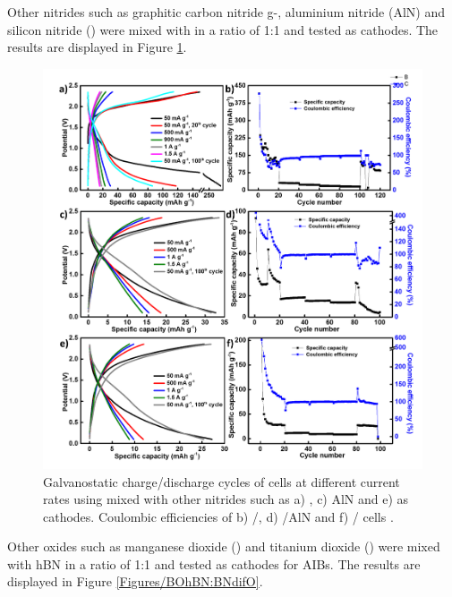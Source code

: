 Other nitrides such as graphitic carbon nitride g-, aluminium nitride (AlN) and silicon nitride () were mixed with  in a ratio of 1:1 and tested as cathodes. The results are displayed in Figure \ref{Figures/BOhBN:Bonit}. 
\begin{figure}[tbh!]
\centering
\includegraphics[width=\textwidth]{Figures/BOhBN/Bonit}
\caption{Galvanostatic charge/discharge cycles of cells at different current rates using  mixed with other nitrides such as a) , c) AlN and e)  as cathodes. Coulombic efficiencies of b) /, d) /AlN and f) / cells .}
\label{Figures/BOhBN:Bonit}
\end{figure}

Other oxides such as manganese dioxide () and titanium dioxide () were mixed with hBN in a ratio of 1:1 and tested as cathodes for AIBs. The results are displayed in Figure \ref{Figures/BOhBN:BNdifO}.

